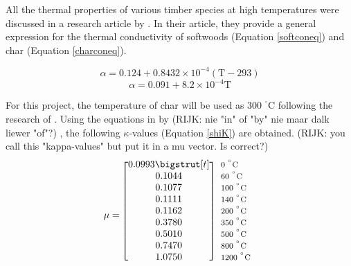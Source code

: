 All the thermal properties of various timber species at high temperatures were discussed in a research article by \citet{Shi:2021}.
 In their article, they provide a general expression for the thermal conductivity of softwoods (Equation \ref{softconeq}) and char (Equation \ref{charconeq}).  


 \begin{equation}\label{softconeq}
 \alpha = 0.124 +0.8432 \times 10^{-4} (\text{T}-293) 
 \end{equation}
 \begin{equation}\label{charconeq}
 \alpha = 0.091 + 8.2 \times 10^{-4} \text{T}
 \end{equation}
 
 For this project, the temperature of char will be used as 300 $^{^\circ}$C following the research of \citeauthor{Westhuyzen:2020}. 
 Using the equations in by (RIJK: nie "in" of "by" nie maar dalk liewer "of"?) \citeauthor{Shi:2021}, the following $\kappa$-values (Equation \ref{shiK}) are obtained.  (RIJK:  you call this "kappa-values" but put it in a mu vector. Is correct?)
\begin{equation}\label{shiK}
  \mu=
  \begin{blockarray}{*{1}{c} l}
    \begin{block}{[*{1}{c}]>{$\footnotesize}l<{$}}
     	0.0993\bigstrut[t] & 0 $^{^\circ}\text{C}$\\
		0.1044& 60 $^{^\circ}\text{C}$\\ 
		0.1077& 100 $^{^\circ}\text{C}$\\ 
		0.1111& 140 $^{^\circ}\text{C}$\\ 
		0.1162& 200 $^{^\circ}\text{C}$\\ 
		0.3780& 350 $^{^\circ}\text{C}$\\
		0.5010& 500 $^{^\circ}\text{C}$\\ 
		0.7470& 800 $^{^\circ}\text{C}$\\ 
		1.0750& 1200 $^{^\circ}\text{C}$\\
    \end{block}
  \end{blockarray}
\end{equation}
 
